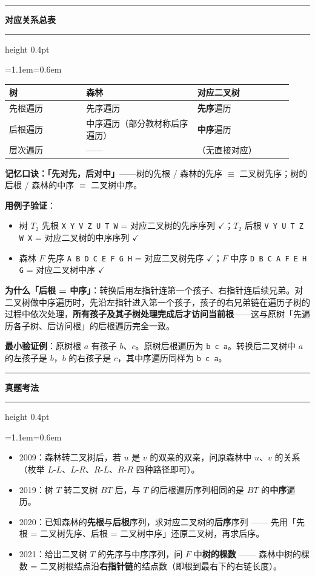 \documentclass[11pt,openany,UTF8]{ctexbook}
\newcommand{\callouthead}[2]{%
  \par\addvspace{7pt}\noindent
  {\color{#1}\rule[-0.15em]{3pt}{1.05em}}\hspace{0.5em}%
  {\bfseries\color{#1}#2}\par\nobreak\vspace{-0.35em}%
  {\color{rulesep}\hrule height 0.4pt}\nobreak\vspace{0.45em}%
  \begingroup\small\setlength{\parindent}{0pt}%
  \leftskip=1.1em\rightskip=0.6em\noindent\ignorespaces}
\newcommand{\calloutend}{\par\endgroup\addvspace{7pt}}
\newenvironment{callkey}[1]{\callouthead{keybar}{#1}}{\calloutend}
\newenvironment{callexam}[1]{\callouthead{exambar}{#1}}{\calloutend}
\begin{document}
\begin{callkey}{对应关系总表}
\begingroup\small\setlength{\tabcolsep}{4.0pt}
\begin{longtable}{@{}L{0.2518\linewidth}L{0.3620\linewidth}L{0.3147\linewidth}@{}}
\toprule
\textbf{树} & \textbf{森林} & \textbf{对应二叉树} \\
\midrule
\endhead
先根遍历 & 先序遍历 & \textbf{先序}遍历 \\
后根遍历 & 中序遍历（部分教材称后序遍历） & \textbf{中序}遍历 \\
层次遍历 & —— & （无直接对应） \\
\bottomrule
\end{longtable}
\endgroup

\textbf{记忆口诀：「先对先，后对中」}——树的先根 / 森林的先序 $\equiv$ 二叉树先序；树的后根 / 森林的中序 $\equiv$ 二叉树中序。

\end{callkey}

\textbf{用例子验证}：

\begin{itemize}
\item 树 $T_2$ 先根 \texttt{X Y V Z U T W} = 对应二叉树的先序序列 $\checkmark$；$T_2$ 后根 \texttt{V Y U T Z W X} = 对应二叉树的中序序列 $\checkmark$
\item 森林 $F$ 先序 \texttt{A B D C E F G H} = 对应二叉树先序 $\checkmark$；$F$ 中序 \texttt{D B C A F E H G} = 对应二叉树中序 $\checkmark$
\end{itemize}
\textbf{为什么「后根 = 中序」}：转换后用左指针连第一个孩子、右指针连后续兄弟。对二叉树做中序遍历时，先沿左指针进入第一个孩子，孩子的右兄弟链在遍历子树的过程中依次处理，\textbf{所有孩子及其子树处理完成后才访问当前根}——这与原树「先遍历各子树、后访问根」的后根遍历完全一致。

\textbf{最小验证例}：原树根 $a$ 有孩子 $b$、$c$。原树后根遍历为 \texttt{b c a}。转换后二叉树中 $a$ 的左孩子是 $b$，$b$ 的右孩子是 $c$，其中序遍历同样为 \texttt{b c a}。

\begin{callexam}{真题考法}
\begin{itemize}
\item 2009：森林转二叉树后，若 $u$ 是 $v$ 的双亲的双亲，问原森林中 $u$、$v$ 的关系（枚举 $L$-$L$、$L$-$R$、$R$-$L$、$R$-$R$ 四种路径即可）。
\item 2019：树 $T$ 转二叉树 $BT$ 后，与 $T$ 的后根遍历序列相同的是 $BT$ 的\textbf{中序}遍历。
\item 2020：已知森林的\textbf{先根}与\textbf{后根}序列，求对应二叉树的\textbf{后序}序列 —— 先用「先根 = 二叉树先序、后根 = 二叉树中序」还原二叉树，再求后序。
\item 2021：给出二叉树 $T$ 的先序与中序序列，问 $F$ 中\textbf{树的棵数} —— 森林中树的棵数 = 二叉树根结点沿\textbf{右指针链}的结点数（即根到最右下的右链长度）。
\end{itemize}
\end{callexam}
\end{document}
